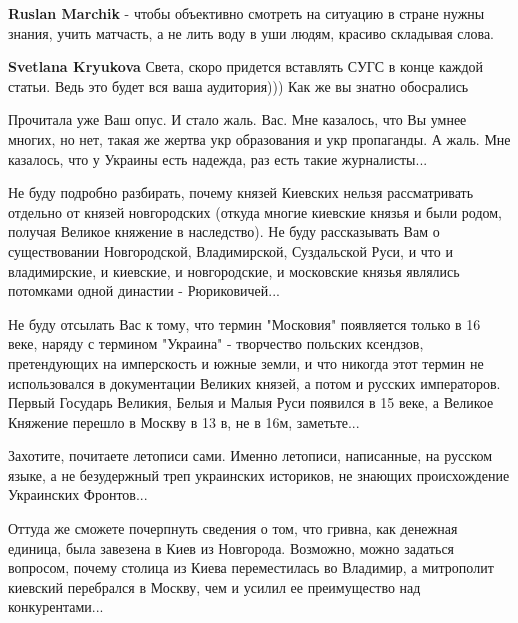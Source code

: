 \begin{itemize}
\begin{itemize}
\textbf{Ruslan Marchik} - чтобы объективно смотреть на ситуацию в стране нужны знания, учить матчасть, а не лить воду в уши людям, красиво складывая слова.

 
\textbf{Svetlana Kryukova} Света, скоро придется вставлять СУГС в конце каждой статьи. Ведь это будет вся ваша аудитория))) Как же вы знатно обосрались

\end{itemize}

 

Прочитала уже Ваш опус. И стало жаль. Вас. Мне казалось, что Вы умнее многих,
но нет, такая же жертва укр образования и укр пропаганды. А жаль. Мне казалось,
что у Украины есть надежда, раз есть такие журналисты...

Не буду подробно разбирать, почему князей Киевских нельзя рассматривать
отдельно от князей новгородских (откуда многие киевские князья и были родом,
получая Великое княжение в наследство). Не буду рассказывать Вам о
существовании Новгородской, Владимирской, Суздальской Руси, и что и
владимирские, и киевские, и новгородские, и московские князья являлись
потомками одной династии - Рюриковичей... 

Не буду отсылать Вас к тому, что термин "Московия" появляется только в 16 веке,
наряду с термином "Украина" - творчество польских ксендзов, претендующих на
имперскость и южные земли, и что никогда этот термин не использовался в
документации Великих князей, а потом и русских императоров. Первый Государь
Великия, Белыя и Малыя Руси появился в 15 веке, а Великое Княжение перешло в
Москву в 13 в, не в 16м, заметьте...

Захотите, почитаете летописи сами. Именно летописи, написанные, на
русском языке, а не безудержный треп украинских историков, не знающих
происхождение Украинских Фронтов...

Оттуда же сможете почерпнуть сведения о том, что гривна, как денежная единица,
была завезена в Киев из Новгорода. Возможно, можно задаться вопросом, почему
столица из Киева переместилась во Владимир, а митрополит киевский перебрался в
Москву, чем и усилил ее преимущество над конкурентами... 


\end{itemize}
